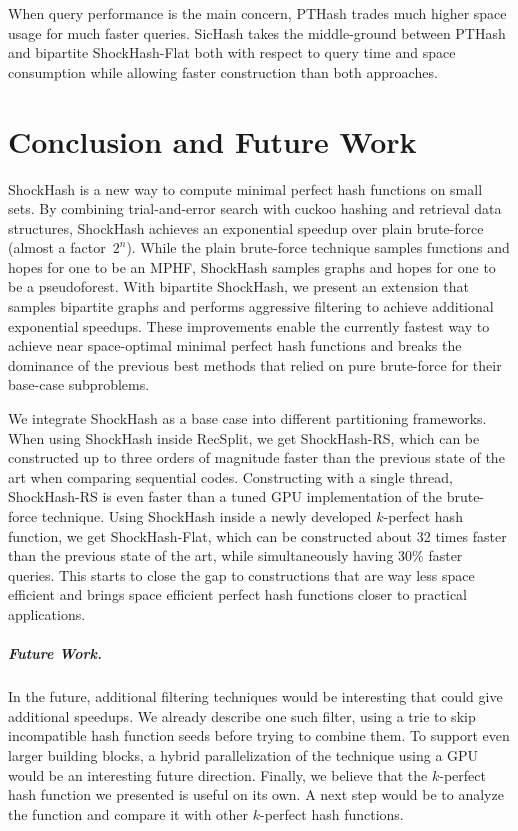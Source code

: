 \documentclass[a4paper,USenglish,cleveref]{lipics-v2021}
\newcommand{\myparagraph}[1]{\subparagraph*{#1}}
\begin{document}
When query performance is the main concern, PTHash \cite{pibiri2021pthash} trades much higher space usage for much faster queries.
SicHash takes the middle-ground between PTHash and bipartite ShockHash-Flat both with respect to query time and space consumption while allowing faster construction than both approaches.
%
%

\section{Conclusion and Future Work}\label{s:conclusion}
ShockHash is a new way to compute minimal perfect hash functions on small sets.
By combining trial-and-error search with cuckoo hashing and retrieval data structures, ShockHash achieves an exponential speedup over plain brute-force (almost a factor~$2^n$).
While the plain brute-force technique samples functions and hopes for one to be an MPHF, ShockHash samples graphs and hopes for one to be a pseudoforest.
With bipartite ShockHash, we present an extension that samples bipartite graphs and performs aggressive filtering to achieve additional exponential speedups.
These improvements enable the currently fastest way to achieve near space-optimal minimal perfect hash functions and breaks the dominance of the previous best methods that relied on pure brute-force for their base-case subproblems.

We integrate ShockHash as a base case into different partitioning frameworks.
When using ShockHash inside RecSplit, we get ShockHash-RS, which can be constructed up to three orders of magnitude faster than the previous state of the art when comparing sequential codes.
Constructing with a single thread, ShockHash-RS is even faster than a tuned GPU implementation of the brute-force technique.
Using ShockHash inside a newly developed $k$-perfect hash function, we get ShockHash-Flat, which can be constructed about 32 times faster than the previous state of the art, while simultaneously having 30\% faster queries.
This starts to close the gap to constructions that are way less space efficient and brings space efficient perfect hash functions closer to practical applications.

\myparagraph{Future Work.}
In the future, additional filtering techniques would be interesting that could give additional speedups.
We already describe one such filter, using a trie to skip incompatible hash function seeds before trying to combine them.
To support even larger building blocks, a hybrid parallelization of the technique using a GPU would be an interesting future direction.
Finally, we believe that the $k$-perfect hash function we presented is useful on its own.
A next step would be to analyze the function and compare it with other $k$-perfect hash functions.

%
%
%


\end{document}
